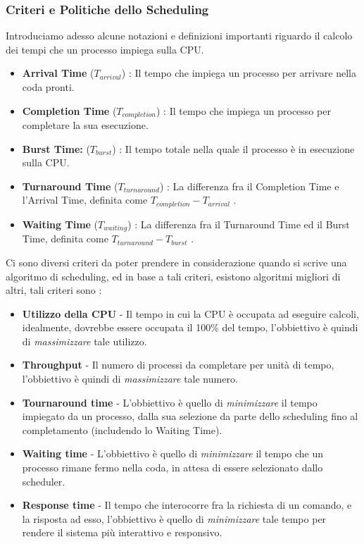 \documentclass[12pt, letterpaper]{article}
\begin{document}
\subsubsection{Criteri e Politiche dello Scheduling}
Introduciamo adesso alcune notazioni e definizioni importanti riguardo il calcolo dei tempi che un processo 
impiega sulla CPU.\begin{itemize}
    \item \textbf{Arrival Time} (\(T_{arrival}\)) : Il tempo che impiega un processo per arrivare nella coda pronti.
    \item \textbf{Completion Time}  (\(T_{completion}\)) : Il tempo che impiega un processo per completare la sua esecuzione.
    \item \textbf{Burst Time:}  (\(T_{burst}\)) : Il tempo totale nella quale il processo è in esecuzione sulla CPU.
    \item \textbf{ Turnaround Time} (\(T_{turnaround}\))  : La differenza fra il Completion Time e l'Arrival Time, definita 
    come \(T_{completion}-T_{arrival}\) .
    \item \textbf{ Waiting Time} (\(T_{waiting}\)) : La differenza fra il Turnaround Time ed il Burst Time, definita 
    come \(T_{turnaround}-T_{burst}\) .
\end{itemize}
Ci sono diversi criteri da poter prendere in considerazione quando si scrive una algoritmo di scheduling, ed in 
base a tali criteri, esistono algoritmi migliori di altri, tali criteri sono :\begin{itemize}
    \item \textbf{Utilizzo della CPU} - Il tempo in cui la CPU è occupata ad eseguire calcoli, idealmente, dovrebbe 
    essere occupata il 100\(\%\) del tempo, l'obbiettivo è quindi di \textit{massimizzare} tale utilizzo.
    \item \textbf{Throughput} - Il numero di processi da completare per unità di tempo, l'obbiettivo è quindi di \textit{massimizzare} tale numero.
    \item \textbf{Tournaround time} - L'obbiettivo è quello di \textit{minimizzare} il tempo impiegato da un processo, 
    dalla sua selezione da parte dello scheduling fino al completamento (includendo lo Waiting Time).
    \item \textbf{Waiting time} - L'obbiettivo è quello di \textit{minimizzare} il tempo che un processo 
    rimane fermo nella coda, in attesa di essere selezionato dallo scheduler.
    \item \textbf{Response time} - Il tempo che interocorre fra la richiesta di un comando, e la risposta ad esso, l'obbiettivo 
    è quello di \textit{minimizzare} tale tempo per rendere il sistema più interattivo e responsivo.
\end{itemize}
\end{document}
